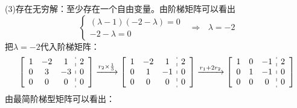 \documentclass{article}
\begin{document}
\begin{jie}
(3)存在无穷解：至少存在一个自由变量。由阶梯矩阵可以看出
\begin{equation*}
  \begin{cases}
    (\lambda-1)(-2-\lambda)=0\\
    -2-\lambda=0
  \end{cases}
  ~~~\Rightarrow~~~\lambda=-2
\end{equation*}
把$\lambda=-2$代入阶梯矩阵：
\begin{equation*}
\left[
\begin{array}{c:c}
\begin{matrix}
1& -2 & 1 \\
0 & 3 & -3  \\
0 & 0 & 0 \\
\end{matrix}
&
\begin{matrix}
2 \\
0 \\
0 \\
\end{matrix}
\end{array}
\right]
\xrightarrow{ r_{2}\times\frac{1}{3}}
{\left[
\begin{array}{c:c}
\begin{matrix}
1& -2 & 1 \\
0 & 1 & -1  \\
0 & 0 & 0 \\
\end{matrix}
&
\begin{matrix}
2 \\
0 \\
0 \\
\end{matrix}
\end{array}
\right]
}
\xrightarrow{ r_{1}+2r_{2}}
{\left[
\begin{array}{c:c}
\begin{matrix}
1& 0 & -1 \\
0 & 1 & -1  \\
0 & 0 & 0 \\
\end{matrix}
&
\begin{matrix}
2 \\
0 \\
0 \\
\end{matrix}
\end{array}
\right]
}
\end{equation*}
由最简阶梯型矩阵可以看出：
\begin{equation*}

\end{equation*}
\end{jie}
\end{document}
